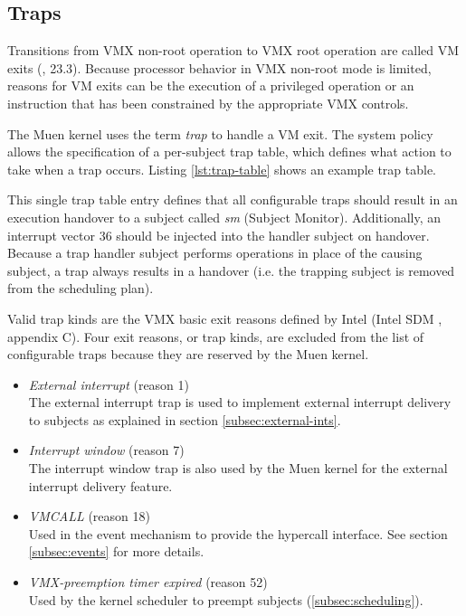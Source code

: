 \subsection{Traps}\label{subsec:traps}
Transitions from VMX non-root operation to VMX root operation are called VM
exits (\cite{IntelSDM}, 23.3). Because processor behavior in VMX non-root mode
is limited, reasons for VM exits can be the execution of a privileged operation
or an instruction that has been constrained by the appropriate VMX controls.

The Muen kernel uses the term \emph{trap} to handle a VM exit. The system policy
allows the specification of a per-subject trap table, which defines what action
to take when a trap occurs. Listing \ref{lst:trap-table} shows an example trap
table.



This single trap table entry defines that all configurable traps should result
in an execution handover to a subject called \emph{sm} (Subject
Monitor). Additionally, an interrupt vector 36 should be injected into
the handler subject on handover. Because a trap handler subject performs
operations in place of the causing subject, a trap always results in a handover
(i.e. the trapping subject is removed from the scheduling plan).

Valid trap kinds are the VMX basic exit reasons defined by Intel (Intel SDM
\cite{IntelSDM}, appendix C). Four exit reasons, or trap kinds, are excluded
from the list of configurable traps because they are reserved by the Muen
kernel.

\begin{itemize}
	\item \emph{External interrupt} (reason 1)\\
		The external interrupt trap is used to implement external interrupt
		delivery to subjects as explained in section \ref{subsec:external-ints}.
	\item \emph{Interrupt window} (reason 7)\\
		The interrupt window trap is also used by the Muen kernel for the
		external interrupt delivery feature.
	\item \emph{VMCALL} (reason 18)\\
		Used in the event mechanism to provide the hypercall interface. See
		section \ref{subsec:events} for more details.
	\item \emph{VMX-preemption timer expired} (reason 52)\\
		Used by the kernel scheduler to preempt subjects
		(\ref{subsec:scheduling}).
\end{itemize}

